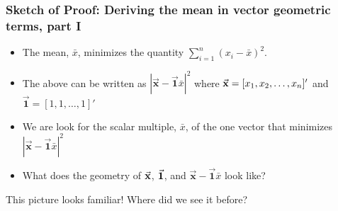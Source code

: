 \documentclass{beamer}
\begin{document}
\begin{frame}
  \frametitle{Sketch of Proof: Deriving the mean in vector geometric terms, part I}

\begin{itemize}

\item The mean, $\bar{x}$, minimizes the quantity $\sum_{i=1}^{n}(x_i-\bar{x})^2$.


\item The above can be written as $|\vec{\mathbf{x}}-\vec{\mathbf{1}}\bar{x}|^2$ where $\vec{\mathbf{x}} = [x_1, x_2, \ldots, x_n]'$ and $\vec{\mathbf{1}} = [1,1,\ldots,1]'$

\item We are look for the scalar multiple, $\bar{x}$, of the one vector that minimizes $|\vec{\mathbf{x}}-\vec{\mathbf{1}}\bar{x}|^2$

\item What does the geometry of $\vec{\mathbf{x}}$, $\vec{\mathbf{1}}$, and $\vec{\mathbf{x}}-\vec{\mathbf{1}}\bar{x}$ look like?

\end{itemize}

\smallskip

\begin{center}
\end{center}

This picture looks familiar!  Where did we see it before?

\end{frame}

\end{document}
